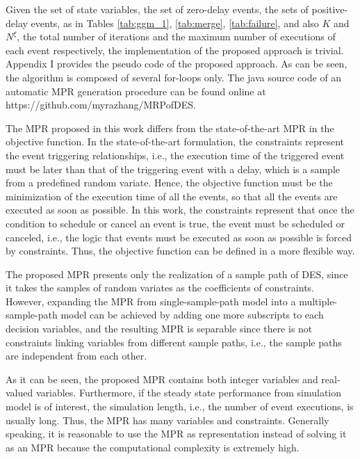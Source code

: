 \documentclass[]{interact}
\theoremstyle{plain}%
\theoremstyle{definition}
\theoremstyle{remark}
\begin{document}
Given the set of state variables, the set of zero-delay events, the sets of positive-delay events, as in Tables \ref{tab:ggm_1}, \ref{tab:merge}, \ref{tab:failure}, and also $K$ and $N^{\xi}$, the total number of  iterations and the maximum number of executions of each event respectively, the implementation of the proposed approach is trivial. Appendix I provides the pseudo code of the proposed approach. As can be seen, the algorithm is composed of several for-loops only. The java source code of an automatic MPR generation procedure can be found online at https://github.com/myrazhang/MRPofDES.

The MPR proposed in this work differs from the state-of-the-art MPR \citep{chan2008optimization} in the objective function. In the state-of-the-art formulation, the constraints represent the event triggering relationships, i.e., the execution time of the triggered event must be later than that of the triggering event with a delay, which is a sample from a predefined random variate. Hence, the objective function must be the minimization of the execution time of all the events, so that all the events are executed as soon as possible. In this work, the constraints represent that once the condition to schedule or cancel an event is true, the event must be scheduled or canceled, i.e., the logic that events must be executed as soon as possible is forced by constraints. Thus, the objective function can be defined in a more flexible way. 

The proposed MPR presents only the realization of a sample path of DES, since it takes the samples of random variates as the coefficients of constraints. However, expanding the MPR from single-sample-path model into a multiple-sample-path model can be achieved by adding one more subscripts to each decision variables, and the resulting MPR is separable since there is not constraints linking variables from different sample paths, i.e., the sample paths are independent from each other. 

As it can be seen, the proposed MPR contains both integer variables and real-valued variables. Furthermore, if the steady state performance from simulation model is of interest, the simulation length, i.e., the number of event executions, is usually long. Thus, the MPR has many variables and constraints. Generally speaking, it is reasonable to use the MPR as representation instead of solving it as an MPR because the computational complexity is extremely high. 
\end{document}
